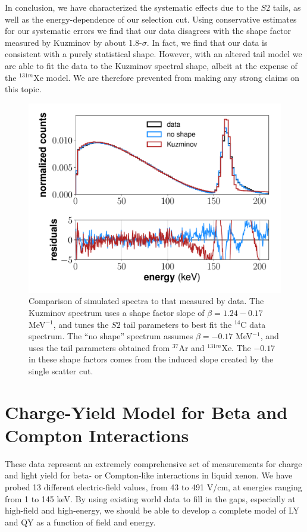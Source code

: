 In conclusion, we have characterized the systematic effects due to the $S2$ tails, as well as the energy-dependence of our selection cut. Using conservative estimates for our systematic errors we find that our data disagrees with the shape factor measured by Kuzminov by about 1.8-$\sigma$. In fact, we find that our data is consistent with a purely statistical shape. However, with an altered tail model we are able to fit the data to the Kuzminov spectral shape, albeit at the expense of the $^{131m}$Xe model. We are therefore prevented from making any strong claims on this topic.
\begin{figure}[!h]
\centering
  \includegraphics[width=\textwidth]{Figures/C14_spectrum_shapecomp.pdf}
\caption{Comparison of simulated spectra to that measured by data. The Kuzminov spectrum uses a shape factor slope of $\beta=1.24-0.17$ MeV$^{-1}$, and tunes the $S2$ tail parameters to best fit the $^{14}$C data spectrum. The ``no shape'' spectrum assumes $\beta=-0.17$ MeV$^{-1}$, and uses the tail parameters obtained from $^{37}$Ar and $^{131m}$Xe. The $-0.17$ in these shape factors comes from the induced slope created by the single scatter cut.}
\label{fig:C14_shape}
\end{figure}


\clearpage
\section{Charge-Yield Model for Beta and Compton Interactions}\label{sec:NESTbeta}
These data represent an extremely comprehensive set of measurements for charge and light yield for beta- or Compton-like interactions in liquid xenon. We have probed 13 different electric-field values, from 43 to 491 V/cm, at energies ranging from 1 to 145 keV. By using existing world data to fill in the gaps, especially at high-field and high-energy, we should be able to develop a complete model of LY and QY as a function of field and energy.

